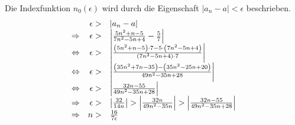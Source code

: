 Die Indexfunktion $\displaystyle n_{0}( \epsilon )$ wird durch die Eigenschaft $\displaystyle |a_{n} -a|< \epsilon $ beschrieben.
\begin{equation*}
  \begin{array}{ c r l }
    & \epsilon  > & |a_{n} -a|\\
    \Rightarrow  & \epsilon  > & \left| \frac{5n^{2} +n-5}{7n^{2} -5n+4} -\frac{5}{7}\right| \\
    \Leftrightarrow  & \epsilon  > & \left| \frac{\left( 5n^{2} +n-5\right) \cdot 7-5\cdot \left( 7n^{2} -5n+4\right)}{\left( 7n^{2} -5n+4\right) \cdot 7}\right| \\
    \Leftrightarrow  & \epsilon  > & \left| \frac{\left( 35n^{2} +7n-35\right) -\left( 35n^{2} -25n+20\right)}{49n^{2} -35n+28}\right| \\
    \Leftrightarrow  & \epsilon  > & \left| \frac{32n-55}{49n^{2} -35n+28}\right| \\
    \Rightarrow  & \epsilon  > & \left| \frac{32}{14n}\right|  >\left| \frac{32n}{49n^{2} -35n}\right|  >\left| \frac{32n-55}{49n^{2} -35n+28}\right| \\
    \Rightarrow  & n > & \frac{16}{7\epsilon }
  \end{array}
\end{equation*}

